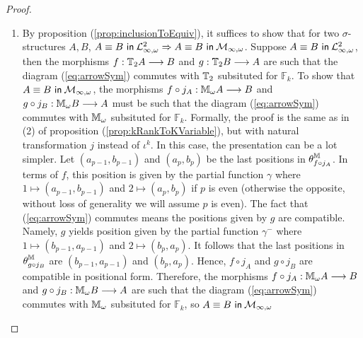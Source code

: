 \begin{prop}
\begin{proof}
\begin{enumerate}[label=(\arabic*)]
\item By proposition (\ref{prop:inclusionToEquiv}), it suffices to show that for two $\sigma$-structures $A,B$, ${A \equiv B \ \mathsf{in}\: \mathcal{L}^{2}_{\infty,\omega}} \Rightarrow {A \equiv B \ \mathsf{in}\: \mathcal{M}_{\infty,\omega}}$. Suppose ${A \equiv B \ \mathsf{in}\: \mathcal{L}^{2}_{\infty,\omega}}$, then the morphisms $f:{\mathbb{T}_{2}A} \longrightarrow B$ and $g:{\mathbb{T}_{2}B} \longrightarrow A$ are such that the diagram (\ref{eq:arrowSym}) commutes with ${\mathbb{T}_{2}}$ subsituted for $\mathbb{F}_{k}$. To show that ${A \equiv B \ \mathsf{in}\: \mathcal{M}_{\infty,\omega}}$, the morphisms $f \circ j_{A}: {\mathbb{M}_{\omega}A} \longrightarrow B$ and $g \circ j_{B}:{\mathbb{M}_{\omega}B} \longrightarrow A$ must be such that the diagram (\ref{eq:arrowSym}) commutes with ${\mathbb{M}_{\omega}}$ subsituted for $\mathbb{F}_{k}$. Formally, the proof is the same as in (2) of proposition (\ref{prop:kRankToKVariable}), but with natural transformation $j$ instead of $\iota^{k}$. In this case, the presentation can be a lot simpler. Let $(a_{p-1},b_{p-1})$ and $(a_{p},b_{p})$ be the last positions in $\theta^{{\mathbb{M}_{}}}_{f \circ j_{A}}$. In terms of $f$, this position is given by the partial function $\gamma$ where $1 \mapsto (a_{p-1},b_{p-1})$ and $2 \mapsto (a_{p},b_{p})$ if $p$ is even (otherwise the opposite, without loss of generality we will assume $p$ is even). The fact that (\ref{eq:arrowSym}) commutes means the positions given by $g$ are compatible. Namely, $g$ yields position given by the partial function $\gamma^{-}$ where $1 \mapsto (b_{p-1},a_{p-1})$ and $2 \mapsto (b_{p},a_{p})$. It follows that the last positions in $\theta^{{\mathbb{M}_{}}}_{g \circ j_{B}}$ are $(b_{p-1},a_{p-1})$ and $(b_{p},a_{p})$. Hence, $f \circ j_{A}$ and $g \circ j_{B}$ are compatible in positional form. Therefore,  the morphisms $f \circ j_{A}: {\mathbb{M}_{\omega}A} \longrightarrow B$ and $g \circ j_{B}:{\mathbb{M}_{\omega}B} \longrightarrow A$ are such that the diagram (\ref{eq:arrowSym}) commutes with ${\mathbb{M}_{\omega}}$ subsituted for $\mathbb{F}_{k}$, so ${A \equiv B \ \mathsf{in}\: \mathcal{M}_{\infty,\omega}}$ 
\end{enumerate}
\end{proof}
\end{prop}
